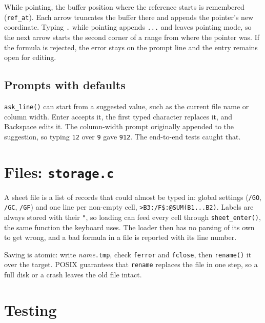 \documentclass[11pt]{article}
\begin{document}
While pointing, the buffer position where the reference starts is
remembered (\texttt{ref\_at}). Each arrow truncates the buffer there and
appends the pointer's new coordinate. Typing \texttt{.} while pointing
appends \texttt{...} and leaves pointing mode, so the next arrow starts the
second corner of a range from where the pointer was. If the formula is
rejected, the error stays on the prompt line and the entry remains open for
editing.

\subsection{Prompts with defaults}

\texttt{ask\_line()} can start from a suggested value, such as the current
file name or column width. Enter accepts it, the first typed character
replaces it, and Backspace edits it. The column-width prompt originally
appended to the suggestion, so typing \texttt{12} over \texttt{9} gave
\texttt{912}. The end-to-end tests caught that.

\section{Files: \texttt{storage.c}}

A sheet file is a list of records that could almost be typed in: global
settings (\texttt{/GO}, \texttt{/GC}, \texttt{/GF}) and one line per
non-empty cell, \texttt{>B3:/F\$:@SUM(B1...B2)}. Labels are always stored
with their \texttt{"}, so loading can feed every cell through
\texttt{sheet\_enter()}, the same function the keyboard uses. The loader
then has no parsing of its own to get wrong, and a bad formula in a file is
reported with its line number.

Saving is atomic: write \emph{name}\texttt{.tmp}, check \texttt{ferror}
and \texttt{fclose}, then \texttt{rename()} it over the target. POSIX
guarantees that \texttt{rename} replaces the file in one step, so a full
disk or a crash leaves the old file intact.

\section{Testing}
\end{document}
